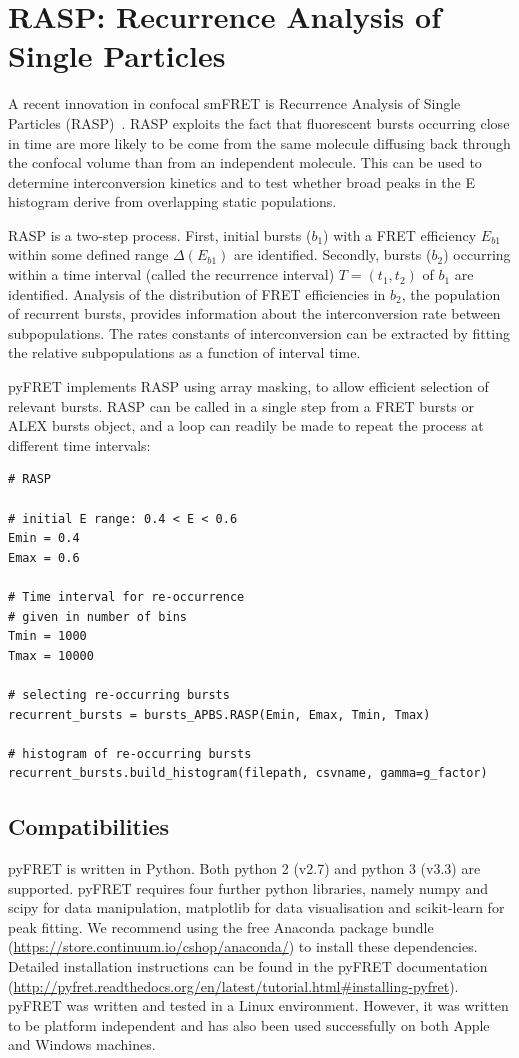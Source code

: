 \section{RASP: Recurrence Analysis of Single Particles}
A recent innovation in confocal smFRET is Recurrence Analysis of Single Particles (RASP)~\cite{hoffmann11}. RASP exploits the fact that fluorescent bursts occurring close in time are more likely to be come from the same molecule diffusing back through the confocal volume than from an independent molecule. This can be used to determine interconversion kinetics and to test whether broad peaks in the E histogram derive from overlapping static populations.

RASP is a two-step process. First, initial bursts ($b_1$) with a FRET efficiency $E_{b1}$ within some defined range $\Delta(E_{b1})$ are identified. Secondly, bursts ($b_2$) occurring within a time interval (called the recurrence interval) $T = (t_1, t_2)$ of $b_1$ are identified. Analysis of the distribution of FRET efficiencies in $b_2$, the population of recurrent bursts, provides information about the interconversion rate between subpopulations. The rates constants of interconversion can be extracted by fitting the relative subpopulations as a function of interval time.

pyFRET implements RASP using array masking, to allow efficient selection of relevant bursts. RASP can be called in a single step from a FRET bursts or ALEX bursts object, and a loop can readily be made to repeat the process at different time intervals:

\begin{lstlisting}
# RASP

# initial E range: 0.4 < E < 0.6
Emin = 0.4
Emax = 0.6

# Time interval for re-occurrence
# given in number of bins
Tmin = 1000
Tmax = 10000

# selecting re-occurring bursts
recurrent_bursts = bursts_APBS.RASP(Emin, Emax, Tmin, Tmax)

# histogram of re-occurring bursts
recurrent_bursts.build_histogram(filepath, csvname, gamma=g_factor)
\end{lstlisting} 

\subsection{Compatibilities}
pyFRET is written in Python. Both python 2 (v2.7) and python 3 (v3.3) are supported. pyFRET requires four further python libraries, namely numpy and scipy for data manipulation, matplotlib for data visualisation and scikit-learn for peak fitting. We recommend using the free Anaconda package bundle (\url{https://store.continuum.io/cshop/anaconda/}) to install these dependencies. Detailed installation instructions can be found in the pyFRET documentation (\url{http://pyfret.readthedocs.org/en/latest/tutorial.html#installing-pyfret}). pyFRET was written and tested in a Linux environment. However, it was written to be platform independent and has also been used successfully on both Apple and Windows machines.

